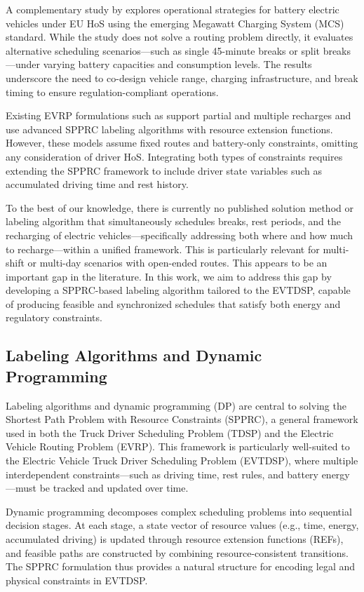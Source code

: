 \documentclass[trsc,dblanonrev]{informs4}
\begin{document}
A complementary study by \citet{schneider2023novel} explores operational strategies for battery electric vehicles under EU HoS using the emerging Megawatt Charging System (MCS) standard. While the study does not solve a routing problem directly, it evaluates alternative scheduling scenarios—such as single 45-minute breaks or split breaks—under varying battery capacities and consumption levels. The results underscore the need to co-design vehicle range, charging infrastructure, and break timing to ensure regulation-compliant operations.

Existing EVRP formulations such as \citet{desaulniers2016exact} support partial and multiple recharges and use advanced SPPRC labeling algorithms with resource extension functions. However, these models assume fixed routes and battery-only constraints, omitting any consideration of driver HoS. Integrating both types of constraints requires extending the SPPRC framework to include driver state variables such as accumulated driving time and rest history.

To the best of our knowledge, there is currently no published solution method or labeling algorithm that simultaneously schedules breaks, rest periods, and the recharging of electric vehicles—specifically addressing both where and how much to recharge—within a unified framework. This is particularly relevant for multi-shift or multi-day scenarios with open-ended routes. This appears to be an important gap in the literature. In this work, we aim to address this gap by developing a SPPRC-based labeling algorithm tailored to the EVTDSP, capable of producing feasible and synchronized schedules that satisfy both energy and regulatory constraints.


\subsection{Labeling Algorithms and Dynamic Programming}

Labeling algorithms and dynamic programming (DP) are central to solving the Shortest Path Problem with Resource Constraints (SPPRC), a general framework used in both the Truck Driver Scheduling Problem (TDSP) and the Electric Vehicle Routing Problem (EVRP). This framework is particularly well-suited to the Electric Vehicle Truck Driver Scheduling Problem (EVTDSP), where multiple interdependent constraints—such as driving time, rest rules, and battery energy—must be tracked and updated over time.

Dynamic programming decomposes complex scheduling problems into sequential decision stages. At each stage, a state vector of resource values (e.g., time, energy, accumulated driving) is updated through resource extension functions (REFs), and feasible paths are constructed by combining resource-consistent transitions. The SPPRC formulation thus provides a natural structure for encoding legal and physical constraints in EVTDSP.
\end{document}
